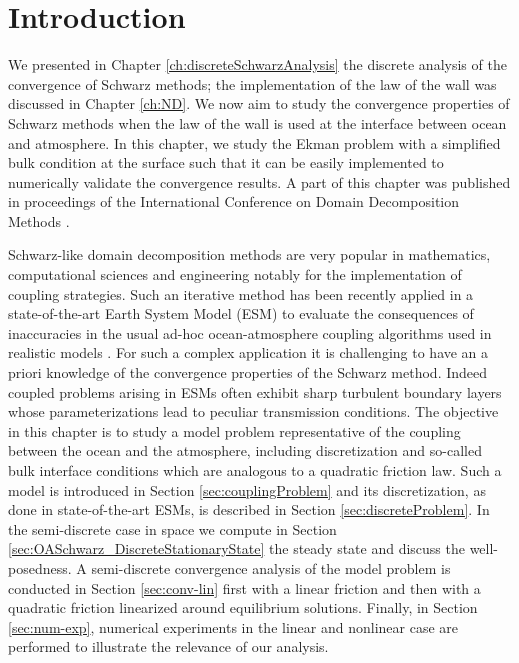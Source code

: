 \section{Introduction}
We presented in Chapter \ref{ch:discreteSchwarzAnalysis}
the discrete analysis of the convergence of Schwarz methods;
the implementation of the law of the wall was discussed
in Chapter \ref{ch:ND}. We now aim to study the convergence
properties of Schwarz methods when the law of the wall is
used at the interface between ocean and
atmosphere. In this chapter, we study the Ekman problem with a
simplified bulk condition at the surface such that
it can be easily implemented to numerically validate the
convergence results.
A part of this chapter was published in proceedings of the
International Conference on Domain Decomposition Methods
\citep{clement_discrete_2021}.
\par
Schwarz-like domain decomposition methods are very popular in 
mathematics, computational sciences and engineering notably for 
the implementation of coupling strategies. Such an iterative method
has been recently applied in a state-of-the-art Earth 
System Model (ESM) to evaluate the consequences of inaccuracies 
in the usual ad-hoc ocean-atmosphere coupling algorithms 
used in realistic models \cite{marti_schwarz_2021}. For such 
a complex application it is challenging to have an a priori 
knowledge of the convergence properties of the Schwarz method. 
Indeed coupled problems arising in ESMs often 
exhibit sharp turbulent boundary layers whose parameterizations 
lead to peculiar transmission conditions. The objective in
this chapter is to study a model problem representative 
of the coupling between the ocean and the atmosphere, including discretization 
and so-called bulk interface conditions which are analogous to a 
quadratic friction law. Such a model is introduced in Section \ref{sec:couplingProblem}
and its discretization, as done in state-of-the-art ESMs, 
is described in Section \ref{sec:discreteProblem}.
In the semi-discrete case in space we compute in Section
\ref{sec:OASchwarz_DiscreteStationaryState} the steady state
and discuss the well-posedness.
A semi-discrete convergence analysis of the model problem is conducted
in Section \ref{sec:conv-lin} first with a linear friction and then
with a quadratic friction linearized around equilibrium solutions. 
Finally, in Section \ref{sec:num-exp}, numerical experiments in the 
linear and nonlinear case are performed to illustrate the relevance 
of our analysis. \par
%
